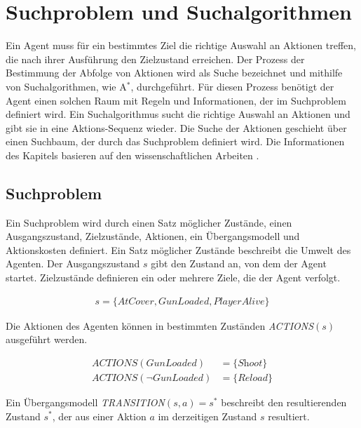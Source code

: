 \chapter{Suchproblem und Suchalgorithmen}
\label{chap:suchproblem und suchalgorithmen}

Ein Agent muss f\"{u}r ein bestimmtes Ziel die richtige Auswahl an Aktionen treffen, die nach ihrer Ausf\"{u}hrung den Zielzustand erreichen. Der Prozess der Bestimmung der Abfolge von Aktionen wird als Suche bezeichnet und mithilfe von Suchalgorithmen, wie A$^*$, durchgef\"{u}hrt. F\"{u}r diesen Prozess ben\"{o}tigt der Agent einen solchen Raum mit Regeln und Informationen, der im Suchproblem definiert wird. Ein Suchalgorithmus sucht die richtige Auswahl an Aktionen und gibt sie in eine Aktions-Sequenz wieder. Die Suche der Aktionen geschieht \"{u}ber einen Suchbaum, der durch das Suchproblem definiert wird. Die Informationen des Kapitels basieren auf den wissenschaftlichen Arbeiten \autocite{RN2020, 4082128, Felner2011}.

\section{Suchproblem}
\label{chap:suchproblem}

Ein Suchproblem wird durch einen Satz m\"{o}glicher Zust\"{a}nde, einen Ausgangszustand, Zielzust\"{a}nde, Aktionen, ein \"{U}bergangsmodell und Aktionskosten definiert. Ein Satz m\"{o}glicher Zust\"{a}nde beschreibt die Umwelt des Agenten. Der Ausgangszustand $s$ gibt den Zustand an, von dem der Agent startet. Zielzust\"{a}nde definieren ein oder mehrere Ziele, die der Agent verfolgt.


\begin{align}
	s = \{\textit{AtCover}, \textit{GunLoaded}, \textit{PlayerAlive}\}
\end{align}


Die Aktionen des Agenten k\"{o}nnen in bestimmten Zust\"{a}nden \textit{ACTIONS}$(s)$ ausgef\"{u}hrt werden.

\begin{align}
	\textit{ACTIONS}(\textit{GunLoaded}) &= \{\textit{Shoot}\} \\
	\textit{ACTIONS}(\lnot \textit{GunLoaded}) &= \{\textit{Reload}\}
\end{align}

Ein \"{U}bergangsmodell \textit{TRANSITION}$(s,a) = s^*$ beschreibt den resultierenden Zustand $s^*$, der aus einer Aktion $a$ im derzeitigen Zustand $s$ resultiert.

